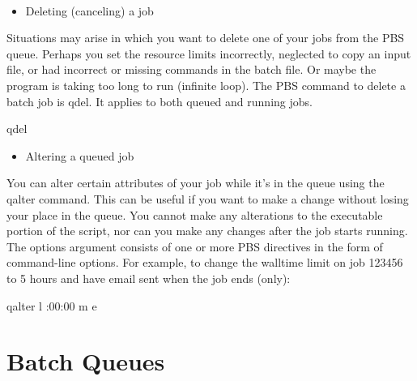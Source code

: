 \documentclass[letterpaper,10pt,english]{sphinxmanual}
\begin{document}
\subsubsection{}
\label{\detokenize{guide:managing-your-jobs}}\begin{itemize}
\item {} 
Deleting (canceling) a job

\end{itemize}

Situations may arise in which you want to delete one of your jobs from the PBS queue. Perhaps you set the resource limits incorrectly, neglected to copy an input file, or had incorrect or missing commands in the batch file. Or maybe the program is taking too long to run (infinite loop). The PBS command to delete a batch job is qdel. It applies to both queued and running jobs.

\begin{sphinxVerbatim}[commandchars=\\\{\}]
\PYGZdl{}\PYGZgt{} qdel 
\end{sphinxVerbatim}
\begin{itemize}
\item {} 
Altering a queued job

\end{itemize}

You can alter certain attributes of your job while it’s in the queue using the qalter command. This can be useful if you want to make a change without losing your place in the queue. You cannot make any alterations to the executable portion of the script, nor can you make any changes after the job starts running.
The options argument consists of one or more PBS directives in the form of command-line options. For example, to change the walltime limit on job 123456 to 5 hours and have email sent when the job ends (only):

\begin{sphinxVerbatim}[commandchars=\\\{\}]
\PYGZdl{}\PYGZgt{} qalter \PYGZhy{}l :00:00 \PYGZhy{}m e 
\end{sphinxVerbatim}


\chapter{Batch Queues}
\label{\detokenize{queue:batch-queues}}\label{\detokenize{queue::doc}}
\end{document}
